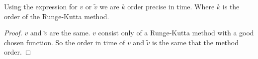  \begin{cor}
  Using the expression for $v$ or $\tilde{v}$ we are $k$ order precise in time. Where $k$ is the order of the Runge-Kutta method.
 \end{cor}
 \begin{proof}
  $v$ and $\tilde{v}$ are the same.
  $v$ consist only of a Runge-Kutta method with a good chosen function.
  So the order in time of $v$ and $\tilde{v}$ is the same that the method order.
 \end{proof}

